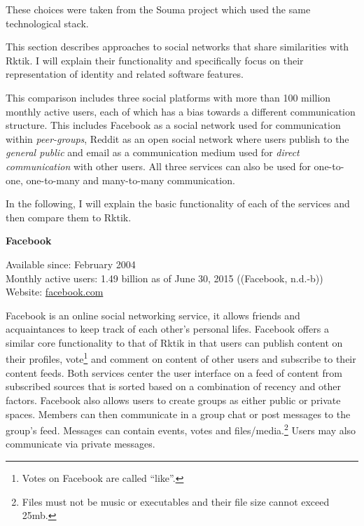 These choices were taken from the Souma project which used the same
technological stack.


This section describes approaches to social networks that share
similarities with Rktik. I will explain their functionality and
specifically focus on their representation of identity and related
software features.

This comparison includes three social platforms with more than 100
million monthly active users, each of which has a bias towards a
different communication structure. This includes Facebook as a social
network used for communication within \emph{peer-groups}, Reddit as an
open social network where users publish to the \emph{general public} and
email as a communication medium used for \emph{direct communication}
with other users. All three services can also be used for one-to-one,
one-to-many and many-to-many communication.

In the following, I will explain the basic functionality of each of the
services and then compare them to Rktik.

\textbf{Facebook}

Available since: February 2004\\
Monthly active users: 1.49 billion as of June 30, 2015 ((Facebook,
n.d.-b))\\
Website: \href{http://facebook.com/}{facebook.com}

Facebook is an online social networking service, it allows friends and
acquaintances to keep track of each other's personal lifes. Facebook
offers a similar core functionality to that of Rktik in that users can
publish content on their profiles, vote\footnote{Votes on Facebook are
  called ``like''.} and comment on content of other users and subscribe
to their content feeds. Both services center the user interface on a
feed of content from subscribed sources that is sorted based on a
combination of recency and other factors. Facebook also allows users to
create groups as either public or private spaces. Members can then
communicate in a group chat or post messages to the group's feed.
Messages can contain events, votes and files/media.\footnote{Files must
  not be music or executables and their file size cannot exceed 25mb.}
Users may also communicate via private messages.

